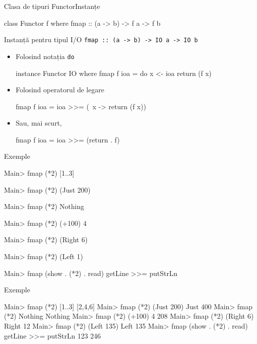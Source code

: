 \documentclass[xcolor=pdftex,romanian,colorlinks]{beamer}
\begin{document}
\begin{frame}[fragile]{Clasa de tipuri Functor}{Instanțe}
\begin{asciihs}
class Functor f where
  fmap :: (a -> b) -> f a -> f b
\end{asciihs}
\vfill
\begin{block}{Instanță pentru tipul I/O \lstinline$fmap :: (a -> b) -> IO a -> IO b$}
\begin{itemize}
\item Folosind notația \lstinline$do$
\begin{asciihs}
instance Functor IO where
  fmap f ioa = do
     x <- ioa
     return (f x)
\end{asciihs}

\item Folosind operatorul de legare
\begin{asciihs}
  fmap f ioa = ioa >>= (\ x -> return (f x))
\end{asciihs}
\item Sau, mai scurt,
\begin{asciihs}
  fmap f ioa = ioa >>= (return . f)
\end{asciihs}
\end{itemize}
\end{block}
\end{frame}

\begin{frame}[fragile]{Exemple}
\begin{asciihs}
Main> fmap (*2) [1..3]

Main> fmap (*2) (Just 200) 

Main> fmap (*2) Nothing  

Main> fmap (*2) (+100) 4

Main> fmap (*2) (Right 6)

Main> fmap (*2) (Left 1)

Main> fmap (show . (*2) . read) getLine  >>=  putStrLn
\end{asciihs}
\end{frame}

\begin{frame}[fragile]{Exemple}
\begin{asciihs}
Main> fmap (*2) [1..3]
[2,4,6]
Main> fmap (*2) (Just 200) 
Just 400
Main> fmap (*2) Nothing  
Nothing
Main> fmap (*2) (+100) 4
208
Main> fmap (*2) (Right 6)
Right 12
Main> fmap (*2) (Left 135)
Left 135
Main> fmap (show . (*2) . read) getLine  >>=  putStrLn
123
246
\end{asciihs}
\end{frame}
\end{document}
